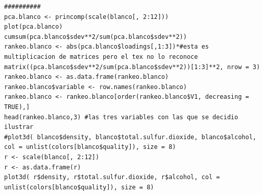 \documentclass[paper=letter, fontsize=11pt]{scrartcl}
\numberwithin{equation}{section} %
\numberwithin{figure}{section} %
\numberwithin{table}{section} %
\begin{document}
\begin{lstlisting}[style=customc,basicstyle=\scriptsize]
##########
pca.blanco <- princomp(scale(blanco[, 2:12]))
plot(pca.blanco)
cumsum(pca.blanco$sdev**2/sum(pca.blanco$sdev**2))
rankeo.blanco <- abs(pca.blanco$loadings[,1:3])*#esta es multiplicacion de matrices pero el tex no lo reconoce matrix((pca.blanco$sdev**2/sum(pca.blanco$sdev**2))[1:3]**2, nrow = 3)
rankeo.blanco <- as.data.frame(rankeo.blanco)
rankeo.blanco$variable <- row.names(rankeo.blanco)
rankeo.blanco <- rankeo.blanco[order(rankeo.blanco$V1, decreasing = TRUE),]
head(rankeo.blanco,3) #las tres variables con las que se decidio ilustrar 
#plot3d( blanco$density, blanco$total.sulfur.dioxide, blanco$alcohol, col = unlist(colors[blanco$quality]), size = 8)
r <- scale(blanco[, 2:12])
r <- as.data.frame(r)
plot3d( r$density, r$total.sulfur.dioxide, r$alcohol, col = unlist(colors[blanco$quality]), size = 8)
\end{lstlisting} 
\end{document}
